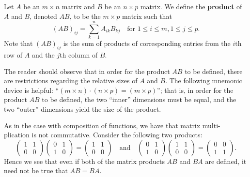 \begin{defn}\label{2.3.1}
  Let \(A\) be an \(m \times n\) matrix and \(B\) be an \(n \times p\) matrix.
  We define the \textbf{product} of \(A\) and \(B\), denoted \(AB\), to be the \(m \times p\) matrix such that
  \[
    (AB)_{i j} = \sum_{k = 1}^n A_{i k} B_{k j} \quad \text{for } 1 \leq i \leq m, 1 \leq j \leq p.
  \]
  Note that \((AB)_{i j}\) is the sum of products of corresponding entries from the \(i\)th row of \(A\) and the \(j\)th column of \(B\).
\end{defn}

\begin{note}
  The reader should observe that in order for the product \(AB\) to be defined, there are restrictions regarding the relative sizes of \(A\) and \(B\).
  The following mnemonic device is helpful:
  ``\((m \times n) \cdot (n \times p) = (m \times p)\)'';
  that is, in order for the product \(AB\) to be defined, the two ``inner'' dimensions must be equal, and the two ``outer'' dimensions yield the size of the product.
\end{note}

\begin{note}
  As in the case with composition of functions, we have that matrix multi- plication is not commutative. Consider the following two products:
  \[
    \begin{pmatrix}
      1 & 1 \\
      0 & 0
    \end{pmatrix} \begin{pmatrix}
      0 & 1 \\
      1 & 0
    \end{pmatrix} = \begin{pmatrix}
      1 & 1 \\
      0 & 0
    \end{pmatrix} \quad \text{and} \quad \begin{pmatrix}
      0 & 1 \\
      1 & 0
    \end{pmatrix} \begin{pmatrix}
      1 & 1 \\
      0 & 0
    \end{pmatrix} = \begin{pmatrix}
      0 & 0 \\
      1 & 1
    \end{pmatrix}.
  \]
  Hence we see that even if both of the matrix products \(AB\) and \(BA\) are defined, it need not be true that \(AB = BA\).
\end{note}


